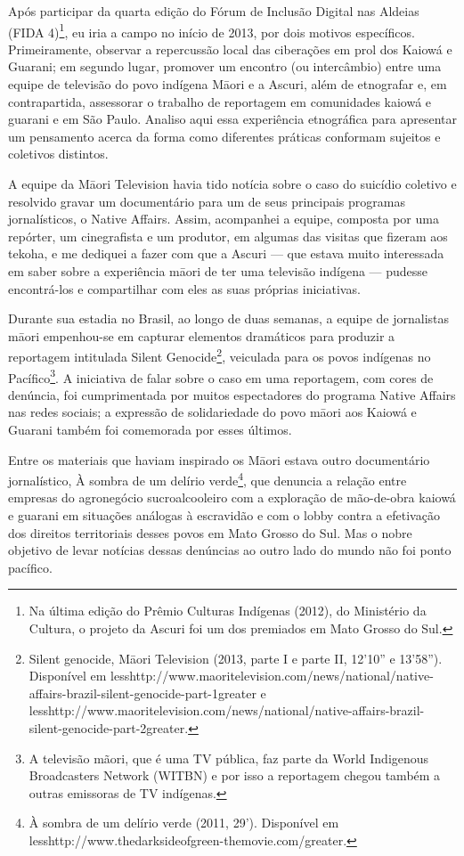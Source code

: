 Após participar da quarta edição do Fórum de Inclusão Digital nas
Aldeias (FIDA 4)\footnote{Na última edição do Prêmio Culturas Indígenas
(2012), do Ministério da Cultura, o projeto da Ascuri foi um dos
premiados em Mato Grosso do Sul.}, eu iria a campo no início de 2013,
por dois motivos específicos. Primeiramente, observar a repercussão
local das ciberações em prol dos Kaiowá e Guarani; em segundo lugar,
promover um encontro (ou intercâmbio) entre uma equipe de televisão do
povo indígena M\=aori e a Ascuri, além de etnografar e, em
contrapartida, assessorar o trabalho de reportagem em comunidades
kaiowá e guarani e em São Paulo. Analiso aqui essa experiência
etnográfica para apresentar um pensamento acerca da forma como
diferentes práticas conformam sujeitos e coletivos distintos.

A equipe da M\=aori Television havia tido notícia sobre o caso do
suicídio coletivo e resolvido gravar um documentário para um de seus
principais programas jornalísticos, o Native Affairs. Assim, acompanhei
a equipe, composta por uma repórter, um cinegrafista e um produtor, em
algumas das visitas que fizeram aos tekoha, e me dediquei a fazer com
que a Ascuri — que estava muito interessada em saber sobre a
experiência m\=aori de ter uma televisão indígena — pudesse
encontrá-los e compartilhar com eles as suas próprias iniciativas.

Durante sua estadia no Brasil, ao longo de duas semanas, a equipe de
jornalistas m\=aori empenhou-se em capturar elementos dramáticos para
produzir a reportagem intitulada Silent Genocide\footnote{Silent
genocide, M\=aori Television (2013, parte I e parte II,
12'10'' e
13'58''). Disponível %
em
{less}http://www.maoritelevision.com/news/national/native-affairs-brazil-silent-genocide-part-1{greater}
e
{less}http://www.maoritelevision.com/news/national/native-affairs-brazil-silent-genocide-part-2{greater}.},
veiculada para os povos indígenas no Pacífico\footnote{A televisão
mãori, que é uma TV pública, faz parte da World Indigenous Broadcasters
Network (WITBN) e por isso a reportagem chegou também a outras
emissoras de TV indígenas. }. A iniciativa de falar sobre o caso em uma
reportagem, com cores de denúncia, foi cumprimentada por muitos
espectadores do programa Native Affairs nas redes sociais; a expressão
de solidariedade do povo m\=aori aos Kaiowá e Guarani também foi
comemorada por esses últimos.

Entre os materiais que haviam inspirado os M\=aori estava outro
documentário jornalístico, À sombra de um delírio verde\footnote{À
sombra de um delírio verde (2011, 29’). Disponível em
{less}http://www.thedarksideofgreen-themovie.com/{greater}.},
que denuncia a relação entre empresas do agronegócio sucroalcooleiro
com a exploração de mão-de-obra kaiowá e guarani em situações análogas
à escravidão e com o lobby contra a efetivação dos direitos
territoriais desses povos em Mato Grosso do Sul. Mas o nobre objetivo
de levar notícias dessas denúncias ao outro lado do mundo não foi ponto
pacífico.


